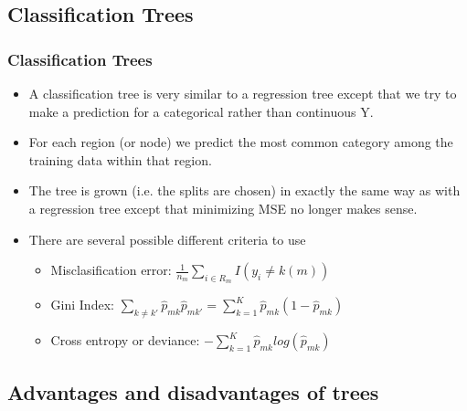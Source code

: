 \documentclass[
  shownotes,
  xcolor={svgnames},
  hyperref={colorlinks,citecolor=DarkBlue,linkcolor=DarkRed,urlcolor=DarkBlue}
  , aspectratio=169]{beamer}
\begin{document}
\subsection{Classification Trees}
\begin{frame}[fragile]
\frametitle{Classification Trees}

\begin{itemize}
\item A classification tree is very similar to a regression tree except that we try to make a prediction for a categorical rather than continuous Y.
\medskip
\item For each region (or node) we predict the most common category among the training data within that region.
\medskip
\item The tree is grown (i.e. the splits are chosen) in exactly the same way as with a regression tree except that minimizing MSE no longer makes sense.
\medskip
\item There are several possible different criteria to use %
\begin{itemize}
  \item Misclasification error: $\frac{1}{n_m}\sum_{i\in R_m} I(y_i \neq k(m))$
  \item Gini Index: $\sum_{k\neq k'}\hat{p}_{mk}\hat{p}_{mk'}=\sum_{k=1}^K \hat{p}_{mk}(1-\hat{p}_{mk})$
  \item Cross entropy or deviance: $- \sum_{k=1}^K \hat{p}_{mk}log(\hat{p}_{mk})$
\end{itemize}
\end{itemize}


\end{frame}
\subsection{Advantages and disadvantages of trees}
\end{document}
